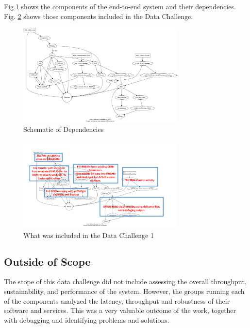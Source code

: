 \documentclass[pdftex,12pt,letter]{article}
\begin{document}
 Fig.\ref{fig:dependencies} shows the components of the end-to-end system and their dependencies. Fig. \ref{fig:intermediate} shows those components included in the Data Challenge. 


\begin{figure}[tbh]
  \centering
  \includegraphics[width=0.75\textwidth]{../figures/dc1_integration.png}
  \caption{Schematic of Dependencies}
  \label{fig:dependencies}
\end{figure}


\begin{figure}[tbh]
  \centering
  \includegraphics[width=0.75\textwidth]{./ReportImages/intermediate.pdf}
  \caption{What was included in the Data Challenge 1}
  \label{fig:intermediate}
\end{figure}

\subsection {Outside of Scope}

The scope of this data challenge did not include assessing the overall throughput, sustainability, and performance  of the system. However,  the groups running each of the components  analyzed  the latency, throughput and robustness of their software and services. This was a very valuable outcome of the work,   together with debugging and identifying problems and solutions. 
\end{document}
